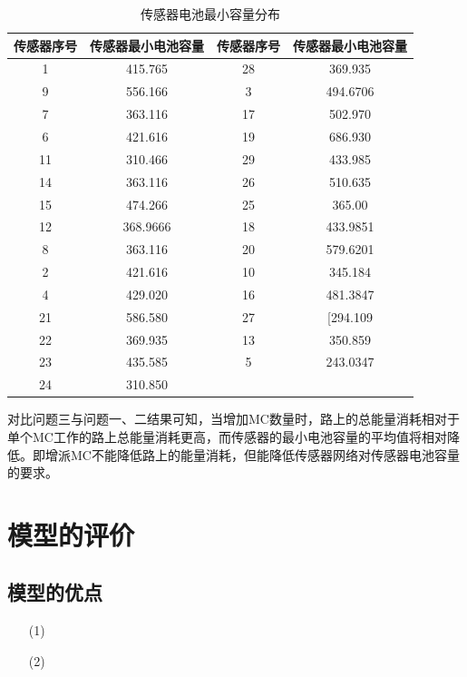 \documentclass{whutmod}
\begin{document}
  		\begin{table}[H]
  	\centering		
  	\caption{传感器电池最小容量分布}\label{adfs}
  	\begin{tabular}{cccc}
  		\toprule[2pt]
  		\multicolumn{1}{m{2.5cm}}{\centering 传感器序号}
  		& \multicolumn{1}{m{4.5cm}}{\centering 传感器最小电池容量}& \multicolumn{1}{m{2.5cm}}{\centering 传感器序号}& \multicolumn{1}{m{4.5cm}}{\centering 传感器最小电池容量}
  		\\
  		\midrule[1pt]
  		1 &   415.765 & 28&369.935\\ 
  		9&   556.166& 3&494.6706\\ 
  		7&   363.116& 17&502.970\\ 
  		6 &   421.616& 19&686.930\\ 
  		11 &   310.466 & 29&433.985\\ 
  		14&   363.116& 26&510.635\\ 
  		15 &  474.266& 25&365.00\\ 
  		12&  368.9666& 18&433.9851\\ 
  		8&  363.116& 20&579.6201\\ 
  		2 &  421.616& 10&345.184\\ 
  		4&  429.020& 16&481.3847\\ 
  		21&  586.580& 27&[294.109 \\ 
  		22 &  369.935& 13&350.859\\ 
  		23 & 435.585& 5&243.0347\\ 
  		24 & 310.850& &\\
  		\bottomrule[2pt]	
  	\end{tabular}
  \end{table}
  对比问题三与问题一、二结果可知，当增加MC数量时，路上的总能量消耗相对于单个MC工作的路上总能量消耗更高，而传感器的最小电池容量的平均值将相对降低。即增派MC不能降低路上的能量消耗，但能降低传感器网络对传感器电池容量的要求。
 
  	\section{模型的评价}
		\subsection{模型的优点}
			\begin{itemize}                                             
			\item [(1)]
			\item [(2)] 	
			\end{itemize}
\end{document}
